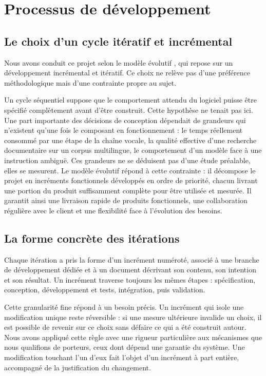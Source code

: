 \section{Processus de développement}

\subsection{Le choix d'un cycle itératif et incrémental}

Nous avons conduit ce projet selon le modèle évolutif \cite{belgacem}, qui repose sur un développement incrémental et itératif. Ce choix ne relève pas d'une préférence méthodologique mais d'une contrainte propre au sujet.

Un cycle séquentiel suppose que le comportement attendu du logiciel puisse être spécifié complètement avant d'être construit. Cette hypothèse ne tenait pas ici. Une part importante des décisions de conception dépendait de grandeurs qui n'existent qu'une fois le composant en fonctionnement : le temps réellement consommé par une étape de la chaîne vocale, la qualité effective d'une recherche documentaire sur un corpus multilingue, le comportement d'un modèle face à une instruction ambiguë. Ces grandeurs ne se déduisent pas d'une étude préalable, elles se mesurent. Le modèle évolutif répond à cette contrainte : il décompose le projet en incréments fonctionnels développés en ordre de priorité, chacun livrant une portion du produit suffisamment complète pour être utilisée et mesurée. Il garantit ainsi une livraison rapide de produits fonctionnels, une collaboration régulière avec le client et une flexibilité face à l'évolution des besoins.

\subsection{La forme concrète des itérations}

Chaque itération a pris la forme d'un incrément numéroté, associé à une branche de développement dédiée et à un document décrivant son contenu, son intention et son résultat. Un incrément traverse toujours les mêmes étapes : spécification, conception, développement et tests, intégration, puis validation.

Cette granularité fine répond à un besoin précis. Un incrément qui isole une modification unique reste réversible : si une mesure ultérieure invalide un choix, il est possible de revenir sur ce choix sans défaire ce qui a été construit autour. Nous avons appliqué cette règle avec une rigueur particulière aux mécanismes que nous qualifions de porteurs, ceux dont dépend une garantie du système. Une modification touchant l'un d'eux fait l'objet d'un incrément à part entière, accompagné de la justification du changement.

